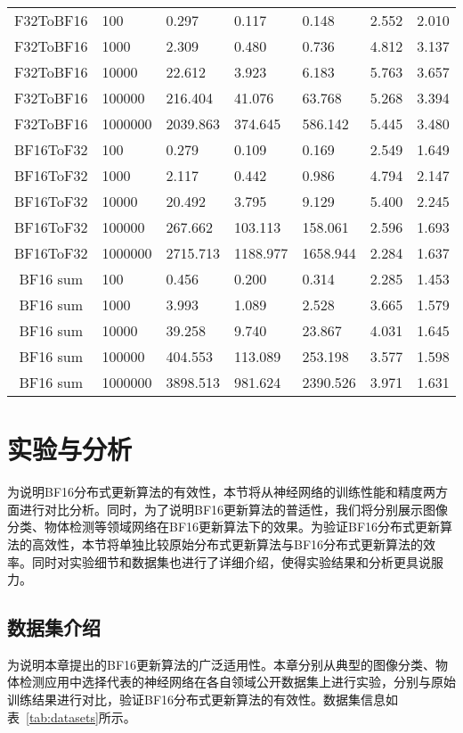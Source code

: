\begin{longtable}[c]{c*{6}{l}}
\endfoot%
\endlastfoot%
F32ToBF16 &	100 & 0.297 & 0.117 & 0.148 & 2.552 & 2.010  \\
F32ToBF16 &	1000 & 2.309 & 0.480 & 0.736 & 4.812 & 3.137  \\
F32ToBF16 &	10000 & 22.612 & 3.923 & 6.183 & 5.763 & 3.657  \\
F32ToBF16 &	100000 & 216.404 & 41.076 & 63.768 & 5.268 & 3.394 \\
F32ToBF16 &	1000000 & 2039.863 & 374.645 & 586.142 & 5.445 & 3.480 \\
BF16ToF32 &	100 & 0.279 & 0.109 & 0.169 & 2.549 & 1.649 \\
BF16ToF32 &	1000 & 2.117 & 0.442 & 0.986 & 4.794 & 2.147 \\
BF16ToF32 &	10000 & 20.492 & 3.795 & 9.129 & 5.400 & 2.245 \\
BF16ToF32 &	100000 & 267.662 & 103.113 & 158.061 & 2.596 & 1.693 \\
BF16ToF32 &	1000000 & 2715.713 & 1188.977 & 1658.944 & 2.284 & 1.637 \\
BF16 sum &	100 & 0.456 & 0.200 & 0.314 & 2.285 & 1.453 \\
BF16 sum &	1000 & 3.993 & 1.089 & 2.528 & 3.665 & 1.579 \\
BF16 sum &	10000 & 39.258 & 9.740 & 23.867 & 4.031 & 1.645 \\
BF16 sum &	100000 & 404.553 & 113.089 & 253.198 & 3.577 & 1.598 \\
BF16 sum &	1000000 & 3898.513 & 981.624 & 2390.526 & 3.971 & 1.631 \\
\bottomrule[1.5pt]
\end{longtable}

\section{实验与分析}
为说明BF16分布式更新算法的有效性，本节将从神经网络的训练性能和精度两方面进行对比分析。同时，为了说明BF16更新算法的普适性，我们将分别展示图像分类、物体检测等领域网络在BF16更新算法下的效果。为验证BF16分布式更新算法的高效性，本节将单独比较原始分布式更新算法与BF16分布式更新算法的效率。同时对实验细节和数据集也进行了详细介绍，使得实验结果和分析更具说服力。

\subsection{数据集介绍}
为说明本章提出的BF16更新算法的广泛适用性。本章分别从典型的图像分类、物体检测应用中选择代表的神经网络在各自领域公开数据集上进行实验，分别与原始训练结果进行对比，验证BF16分布式更新算法的有效性。数据集信息如表~\ref{tab:datasets}所示。

